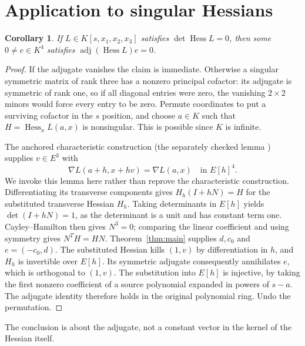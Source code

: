 \documentclass[11pt,a4paper]{article}
\newtheorem{corollary}[theorem]{Corollary}
\newcommand{\Hess}{\operatorname{Hess}}
\newcommand{\adj}{\operatorname{adj}}
\begin{document}
\section{Application to singular Hessians}
\begin{corollary}
If $L\in K[s,x_1,x_2,x_3]$ satisfies $\det\Hess L=0$, then some $0\ne e\in K^4$ satisfies $\adj(\Hess L)e=0$.
\end{corollary}
\begin{proof}
If the adjugate vanishes the claim is immediate. Otherwise a singular symmetric matrix of rank three has a nonzero principal cofactor: its adjugate is symmetric of rank one, so if all diagonal entries were zero, the vanishing $2\times2$ minors would force every entry to be zero. Permute coordinates to put a surviving cofactor in the $s$ position, and choose $a\in K$ such that $H=\Hess_x L(a,x)$ is nonsingular. This is possible since $K$ is infinite.

The anchored characteristic construction (the separately checked lemma ) supplies $v\in E^3$ with
\[
 \nabla L(a+h,x+hv)=\nabla L(a,x)\quad\text{in }E[h]^4.
\]
We invoke this lemma here rather than reprove the characteristic construction. Differentiating its transverse components gives $H_h(I+hN)=H$ for the substituted transverse Hessian $H_h$. Taking determinants in $E[h]$ yields $\det(I+hN)=1$, as the determinant is a unit and has constant term one. Cayley--Hamilton then gives $N^3=0$; comparing the linear coefficient and using symmetry gives $N^TH=HN$. Theorem~\ref{thm:main} supplies $d,c_0$ and $e=(-c_0,d)$. The substituted Hessian kills $(1,v)$ by differentiation in $h$, and $H_h$ is invertible over $E[h]$. Its symmetric adjugate consequently annihilates $e$, which is orthogonal to $(1,v)$. The substitution into $E[h]$ is injective, by taking the first nonzero coefficient of a source polynomial expanded in powers of $s-a$. The adjugate identity therefore holds in the original polynomial ring. Undo the permutation.
\end{proof}
The conclusion is about the adjugate, not a constant vector in the kernel of the Hessian itself.
\end{document}
